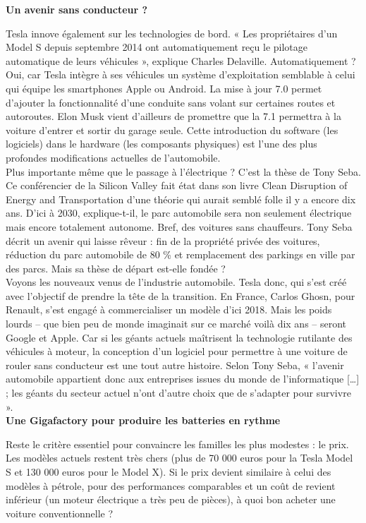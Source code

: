 \documentclass[8pt]{article}
\begin{document}
\textbf{Un avenir sans conducteur ?}

Tesla innove également sur les technologies de bord. « Les propriétaires d’un Model S depuis septembre 2014 ont automatiquement reçu le pilotage automatique de leurs véhicules », explique Charles Delaville. Automatiquement ? Oui, car Tesla intègre à ses véhicules un système d’exploitation semblable à celui qui équipe les smartphones Apple ou Android. La mise à jour 7.0 permet d’ajouter la fonctionnalité d’une conduite sans volant sur certaines routes et autoroutes. Elon Musk vient d’ailleurs de promettre que la 7.1 permettra à la voiture d’entrer et sortir du garage seule. Cette introduction du software (les logiciels) dans le hardware (les composants physiques) est l’une des plus profondes modifications actuelles de l’automobile. \\

Plus importante même que le passage à l’électrique ? C’est la thèse de Tony Seba. Ce conférencier de la Silicon Valley fait état dans son livre Clean Disruption of Energy and Transportation d’une théorie qui aurait semblé folle il y a encore dix ans. D’ici à 2030, explique-t-il, le parc automobile sera non seulement électrique mais encore totalement autonome. Bref, des voitures sans chauffeurs. Tony Seba décrit un avenir qui laisse rêveur : fin de la propriété privée des voitures, réduction du parc automobile de 80 \% et remplacement des parkings en ville par des parcs. Mais sa thèse de départ est-elle fondée ? \\

Voyons les nouveaux venus de l’industrie automobile. Tesla donc, qui s’est créé avec l’objectif de prendre la tête de la transition. En France, Carlos Ghosn, pour Renault, s’est engagé à commercialiser un modèle d’ici 2018. Mais les poids lourds – que bien peu de monde imaginait sur ce marché voilà dix ans – seront Google et Apple. Car si les géants actuels maîtrisent la technologie rutilante des véhicules à moteur, la conception d’un logiciel pour permettre à une voiture de rouler sans conducteur est une tout autre histoire. Selon Tony Seba, « l’avenir automobile appartient donc aux entreprises issues du monde de l’informatique […] ; les géants du secteur actuel n’ont d’autre choix que de s’adapter pour survivre ». \\

\textbf{Une Gigafactory pour produire les batteries en rythme}

Reste le critère essentiel pour convaincre les familles les plus modestes : le prix. Les modèles actuels restent très chers (plus de 70 000 euros pour la Tesla Model S et 130 000 euros pour le Model X). Si le prix devient similaire à celui des modèles à pétrole, pour des performances comparables et un coût de revient inférieur (un moteur électrique a très peu de pièces), à quoi bon acheter une voiture conventionnelle ? \\
\end{document}
